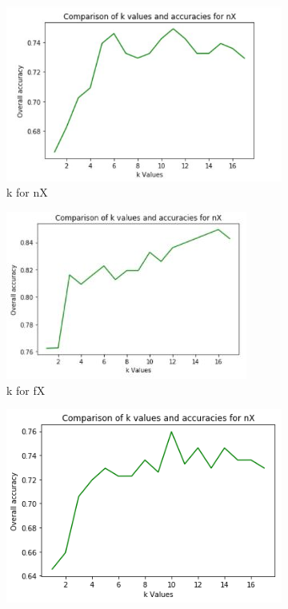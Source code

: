 \documentclass{article}
\begin{document}
\begin{figure}[h]
\begin{subfigure}{.4\columnwidth}
  \centering
  \includegraphics[width=\linewidth]{k_comparison_nX.JPG}  
  \caption{k for nX}
\end{subfigure} \hfill
\begin{subfigure}{.4\columnwidth}
  \centering
  \includegraphics[width=\linewidth]{k_comparison_fX.JPG}  
  \caption{k for fX}
\end{subfigure} \hfill
\begin{subfigure}{.4\columnwidth}
  \centering
  \includegraphics[width=\linewidth]{k_comparison_pX.png}  

\end{subfigure}
\end{figure}
\end{document}
